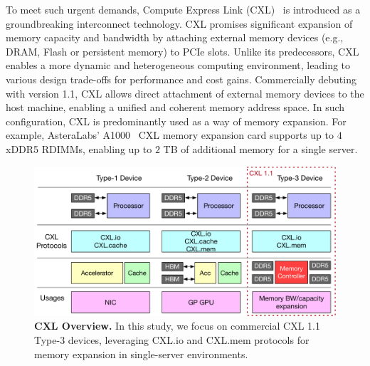 To meet such urgent demands, Compute Express Link (CXL)~\cite{cxl, cxl_azure, cxl-ssd, cxlcentric} is introduced as a groundbreaking interconnect technology. 
CXL promises significant expansion of memory capacity and bandwidth by attaching external memory devices (e.g., DRAM, Flash or persistent memory) to PCIe slots.  
Unlike its predecessors, CXL enables a more dynamic and heterogeneous computing environment, leading to various design trade-offs for performance and cost gains. Commercially debuting with version 1.1, CXL allows direct attachment of external memory devices to the host machine, enabling a unified and coherent memory address space. In such configuration, CXL is predominantly used as a way of memory expansion.
For example, AsteraLabs' A1000~\cite{A1000} CXL memory expansion card supports up to $4$xDDR5 RDIMMs, enabling up to $2$ TB of additional memory for a single server.

\begin{figure}[t]
    \centering
      \includegraphics[width=\columnwidth]{fig/cxl/cxl.pdf}
      \vspace{-1.5em}
      \caption[CXL Overview]{\textbf{CXL Overview.} In this study, we focus on commercial CXL 1.1 Type-3 devices, leveraging CXL.io and CXL.mem protocols for memory expansion in single-server environments.} 
    \label{fig:cxl1.1} \vspace{-1.5em}
    \end{figure}

